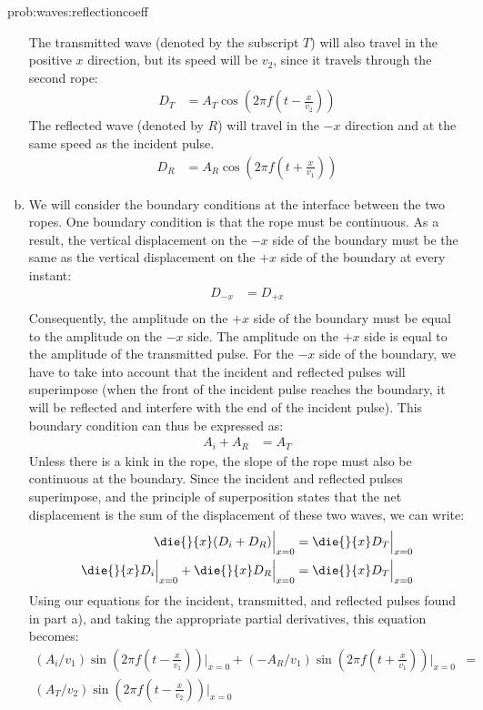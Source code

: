 \begin{solution}{prob:waves:reflectioncoeff}
\begin{enumerate}[(a)]
The transmitted wave (denoted by the subscript $T$) will also travel in the positive $x$ direction, but its speed will be $v_2$, since it travels through the second rope:
\begin{align*}
D_T&=A_T\cos \left( 2\pi f\left(t-\frac{x}{v_2}\right)\right)
\end{align*}
The reflected wave (denoted by $R$) will travel in the $-x$ direction and at the same speed as the incident pulse.
\begin{align*}
D_R&=A_R\cos \left( 2\pi f\left(t+\frac{x}{v_1}\right)\right)
\end{align*}
\item We will consider the boundary conditions at the interface between the two ropes. One boundary condition is that the rope must be continuous. As a result, the vertical displacement on the $-x$ side of the boundary must be the same as the vertical displacement on the $+x$ side of the boundary at every instant: 
\begin{align*}
D_{-x}&=D_{+x}\\
\end{align*}
Consequently, the amplitude on the $+x$ side of the boundary must be equal to the amplitude on the $-x$ side. The amplitude on the $+x$ side is equal to the amplitude of the transmitted pulse. For the $-x$ side of the boundary, we have to take into account that the incident and reflected pulses will superimpose (when the front of the incident pulse reaches the boundary, it will be reflected and interfere with the end of the incident pulse). This boundary condition can thus be expressed as:
\begin{align*}
A_i+A_R&=A_T
\end{align*}
Unless there is a kink in the rope, the slope of the rope must also be continuous at the boundary. Since the incident and reflected pulses superimpose, and the principle of superposition states that the net displacement is the sum of the displacement of these two waves, we can write:
\begin{align*}
\die{}{x}(D_i+D_R)\Bigr|_{x=0}&=\die{}{x}D_T\Bigr|_{x=0}\\
\die{}{x}D_i\Bigr|_{x=0}+\die{}{x}D_R\Bigr|_{x=0}&=\die{}{x}D_T\Bigr|_{x=0}
\end{align*}
Using our equations for the incident, transmitted, and reflected pulses found in part a), and taking the appropriate partial derivatives, this equation becomes:
\begin{align*}
(A_i/v_1) \sin \left(2\pi f\left( t-\frac{x}{v_1}\right)\right)\Bigr|_{x=0}+(-A_R/v_1) \sin \left( 2\pi f\left( t+\frac{x}{v_1}\right)\right)\Bigr|_{x=0}&=\\(A_T/v_2) \sin \left( 2\pi f\left( t-\frac{x}{v_2}\right)\right)\Bigr|_{x=0}

\end{align*}
\end{enumerate}
\end{solution}
